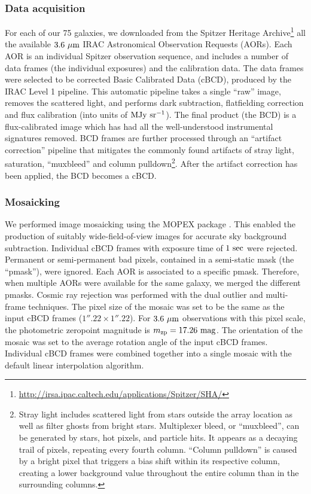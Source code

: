 \documentclass[preprint2]{emulateapj}
\begin{document}
\subsubsection{Data acquisition}
For each of our 75 galaxies, we downloaded from the 
Spitzer Heritage Archive\footnote{\url{http://irsa.ipac.caltech.edu/applications/Spitzer/SHA/}} 
all the available $3.6~\rm \mu m$ IRAC Astronomical Observation Requests (AORs). 
Each AOR is an individual Spitzer observation sequence, and
includes a number of data frames (the individual exposures) and the calibration data.
The data frames were selected to be %
corrected Basic Calibrated Data (cBCD), produced by the IRAC Level 1 pipeline. 
This automatic pipeline takes a single ``raw'' image, removes the scattered light, 
and performs dark subtraction, flatfielding correction and flux calibration (into units of $\rm MJy~sr^{-1}$). 
The final product (the BCD) is a flux-calibrated image which has had all the well-understood instrumental signatures removed.
BCD frames are further processed through an ``artifact correction'' pipeline 
that mitigates the commonly found artifacts of stray light, saturation, ``muxbleed'' and column pulldown\footnote{Stray light 
includes scattered light from stars outside the array location as well as filter ghosts from bright stars. 
Multiplexer bleed, or ``muxbleed'', can be generated by stars, hot pixels, and particle hits.
It appears as a decaying trail of pixels, repeating every fourth column.
``Column pulldown'' is caused by a bright pixel that triggers a bias shift within its respective column, 
creating a lower background value throughout the entire column than in the surrounding columns.}.
After the artifact correction has been applied, the BCD becomes a cBCD.

\subsubsection{Mosaicking}
We performed image mosaicking using the MOPEX package \citep{makovozmarleau2005mopex}.
This enabled the production of suitably wide-field-of-view images for accurate sky background subtraction.
Individual cBCD frames with exposure time of $1~\rm sec$ were rejected.
Permanent or semi-permanent bad pixels, contained in a semi-static mask (the ``pmask''), were ignored.
Each AOR is associated to a specific pmask. 
Therefore, when multiple AORs were available for the same galaxy, 
we merged the different pmasks. 
Cosmic ray rejection was performed with the dual outlier and multi-frame techniques.
The pixel size of the mosaic was set to be the same as the input cBCD frames ($1''.22 \times 1''.22$).
For $3.6~\rm \mu m$ observations with this pixel scale, 
the photometric zeropoint magnitude is $m_{\rm zp} = 17.26 \rm~mag$.
The orientation of the mosaic was set to the average rotation angle of the input cBCD frames. 
Individual cBCD frames were combined together into a single mosaic with the default linear interpolation algorithm.
\end{document}

